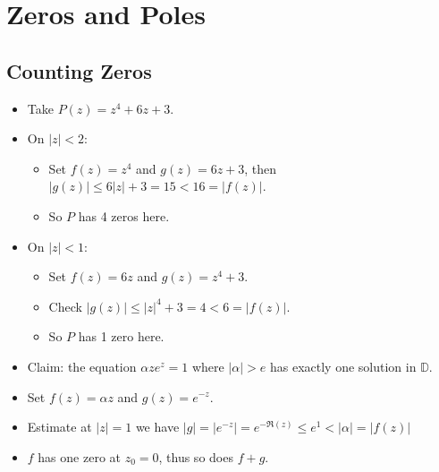 \hypertarget{zeros-and-poles}{%
\section{Zeros and Poles}\label{zeros-and-poles}}

\hypertarget{counting-zeros}{%
\subsection{Counting Zeros}\label{counting-zeros}}

\begin{example}

\begin{itemize}
\tightlist
\item
  Take \(P(z) = z^4 + 6z + 3\).
\item
  On \({\left\lvert {z} \right\rvert} < 2\):

  \begin{itemize}
  \tightlist
  \item
    Set \(f(z) = z^4\) and \(g(z) = 6z + 3\), then
    \({\left\lvert {g(z)} \right\rvert} \leq 6{\left\lvert {z} \right\rvert} + 3 = 15 < 16= {\left\lvert {f(z)} \right\rvert}\).
  \item
    So \(P\) has 4 zeros here.
  \end{itemize}
\item
  On \({\left\lvert {z} \right\rvert} < 1\):

  \begin{itemize}
  \tightlist
  \item
    Set \(f(z) = 6z\) and \(g(z) = z^4 + 3\).
  \item
    Check
    \({\left\lvert {g(z)} \right\rvert} \leq {\left\lvert {z} \right\rvert}^4 + 3 = 4 < 6 = {\left\lvert {f(z)} \right\rvert}\).
  \item
    So \(P\) has 1 zero here.
  \end{itemize}
\end{itemize}

\end{example}

\begin{example}

\begin{itemize}
\tightlist
\item
  Claim: the equation \(\alpha z e^z = 1\) where
  \({\left\lvert {\alpha} \right\rvert} > e\) has exactly one solution
  in \({\mathbb{D}}\).
\item
  Set \(f(z) = \alpha z\) and \(g(z) = e^{-z}\).
\item
  Estimate at \({\left\lvert {z} \right\rvert} =1\) we have
  \({\left\lvert {g} \right\rvert} ={\left\lvert {e^{-z}} \right\rvert} = e^{-\Re(z)} \leq e^1 < {\left\lvert {\alpha} \right\rvert} = {\left\lvert {f(z)} \right\rvert}\)
\item
  \(f\) has one zero at \(z_0 = 0\), thus so does \(f+g\).
\end{itemize}

\end{example}

